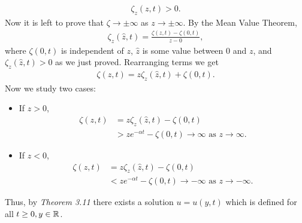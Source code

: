 \begin{questions}
\begin{solution}
\begin{align*}
\zeta_z(z,t)>0.
\end{align*}
Now it is left to prove that $\zeta\rightarrow\pm\infty$ as $z\rightarrow\pm\infty$. By the Mean Value Theorem,
\begin{align*}
\zeta_z(\hat{z},t)=\frac{\zeta(z,t)-\zeta(0,t)}{z-0},
\end{align*}
where $\zeta(0,t)$ is independent of $z$, $\hat{z}$ is some value between $0$ and $z$, and $\zeta_z(\hat{z},t)>0$ as we just proved. Rearranging terms we get
\begin{align*}
\zeta(z,t)=z\zeta_z(\hat{z},t)+\zeta(0,t).
\end{align*}
Now we study two cases:
\begin{itemize}
\item If $z>0$,
\begin{align*}
\zeta(z,t)&=z\zeta_z(\hat{z},t)-\zeta(0,t)\\
&>ze^{-\alpha t}-\zeta(0,t)\rightarrow\infty\text{ as } z\rightarrow\infty.
\end{align*}
\item If $z<0$,
\begin{align*}
\zeta(z,t)&=z\zeta_z(\hat{z},t)-\zeta(0,t)\\
&<ze^{-\alpha t}-\zeta(0,t)\rightarrow -\infty\text{ as } z\rightarrow -\infty.
\end{align*}
\end{itemize}
Thus, by \textsl{Theorem 3.11} there exists a solution $u=u(y,t)$ which is defined for all $t\geq 0,y\in\mathbb{R}$.	
\end{solution}

\end{questions}
